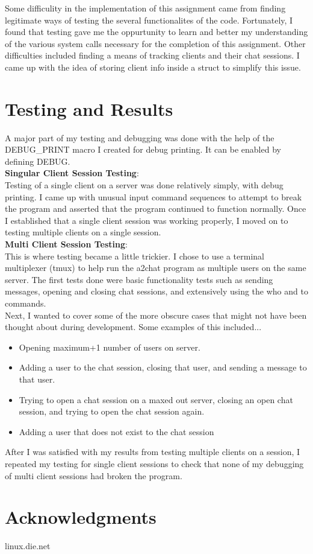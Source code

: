 \documentclass{article}
\begin{document}
\noindent
Some difficulity in the implementation of this
assignment came from finding legitimate ways of testing the several
functionalites of the code. Fortunately, I found that testing gave me the
oppurtunity to learn and better my understanding of the various system calls
necessary for the completion of this assignment.
Other difficulties included finding a means of tracking clients
and their chat sessions. I came up with the idea of storing client
info inside a struct to simplify this issue.


\section{Testing and Results}

A major part of my testing and debugging was done with
the help of the DEBUG\_PRINT macro I created for
debug printing. It can be enabled by defining DEBUG. \\

\noindent
\textbf{Singular Client Session Testing}: \\
Testing of a single client on a server was done
relatively simply, with debug printing. I came up
with unusual input command sequences to attempt to
break the program and asserted that the program
continued to function normally.
Once I established that a single client session was
working properly, I moved on to testing multiple clients
on a single session. \\

\noindent
\textbf{Multi Client Session Testing}: \\
This is where testing became a little trickier.
I chose to use a terminal multiplexer (tmux) to help
run the a2chat program as multiple users on the same
server. The first tests done were basic functionality
tests such as sending messages, opening and closing
chat sessions, and extensively using the who and
to commands.\\

\noindent
Next, I wanted to cover some of the more obscure cases
that might not have been thought about during
development. Some examples of this included...

\begin{itemize}
  \item Opening maximum+1 number of users on server.
  \item  Adding a user to the chat session, closing that
    user, and sending a message to that user.
  \item Trying to open a chat session on a maxed out
    server, closing an open chat session, and trying
    to open the chat session again.
  \item Adding a user that does not exist to the chat
    session
\end{itemize}

\noindent
After I was satisfied with my results from testing
multiple clients on a session, I repeated my testing
for single client sessions to check that none of my
debugging of multi client sessions had broken the
program. \\

\section{Acknowledgments}
linux.die.net
\end{document}
